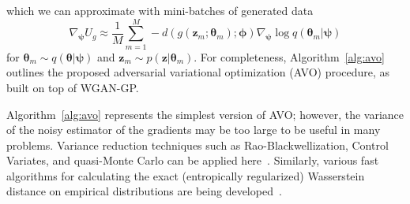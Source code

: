 \documentclass[twocolumn,superscriptaddress,aps]{revtex4-1}
\newcommand{\qxpsi}{q(\mathbf{x}|\bfpsi)}
\newcommand{\bftheta}{{\bm \theta}}
\newcommand{\bfpsi}{{\bm \psi}}
\newcommand{\bfphi}{{\bm \phi}}
\newcommand{\bfz}{\mathbf{z}}
\theoremstyle{plain}
\begin{document}
which we can approximate with mini-batches of
generated data
\begin{equation}
    \nabla_\bfpsi U_g \approx \frac{1}{M} \sum_{m=1}^M -d(g(\bfz_m; \bftheta_m); \bfphi) \nabla_\bfpsi \log q(\bftheta_m|\bfpsi)
\end{equation}
for $\bftheta_m \sim q(\bftheta|\bfpsi)$ and $\bfz_m \sim p(\bfz|\bftheta_m)$.
For completeness, Algorithm~\ref{alg:avo} outlines the proposed adversarial variational
optimization (AVO) procedure, as built on top of WGAN-GP.
%


Algorithm~\ref{alg:avo} represents the simplest version of AVO; however, the
variance of the noisy estimator of the gradients may be too large to be useful
in many problems. Variance reduction techniques such as Rao-Blackwellization,
Control Variates, and quasi-Monte Carlo can be applied here~\citep{ranganath2014black, tran2017variational}.
Similarly, various fast
algorithms for calculating the exact (entropically regularized) Wasserstein distance on
empirical distributions are being developed~\citep{cuturi2013sinkhorn, genevay2016stochastic, montavon2016wasserstein}.
\end{document}
